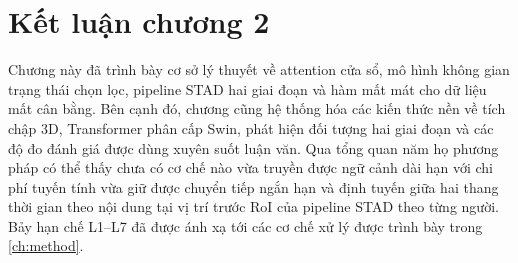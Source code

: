 \section*{Kết luận chương 2}

Chương này đã trình bày cơ sở lý thuyết về attention cửa sổ, mô hình không gian trạng thái chọn lọc, pipeline STAD hai giai đoạn và hàm mất mát cho dữ liệu mất cân bằng. Bên cạnh đó, chương cũng hệ thống hóa các kiến thức nền về tích chập 3D, Transformer phân cấp Swin, phát hiện đối tượng hai giai đoạn và các độ đo đánh giá được dùng xuyên suốt luận văn. Qua tổng quan năm họ phương pháp có thể thấy chưa có cơ chế nào vừa truyền được ngữ cảnh dài hạn với chi phí tuyến tính vừa giữ được chuyển tiếp ngắn hạn và định tuyến giữa hai thang thời gian theo nội dung tại vị trí trước RoI của pipeline STAD theo từng người. Bảy hạn chế L1--L7 đã được ánh xạ tới các cơ chế xử lý được trình bày trong \cref{ch:method}.
